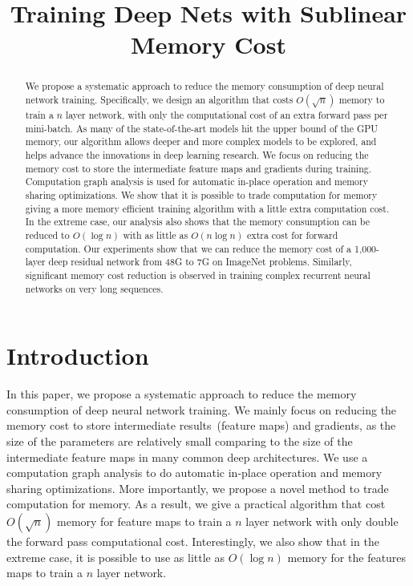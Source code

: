 \title{Training Deep Nets with Sublinear Memory Cost}

\begin{abstract}
We propose a systematic approach to reduce the memory consumption of deep neural network training. Specifically, we design an algorithm that costs $O(\sqrt{n})$ memory to train a $n$ layer network, with only the computational cost of an extra forward pass per mini-batch. As many of the state-of-the-art models hit the upper bound of the GPU memory, our algorithm allows deeper and more complex models to be explored, and helps advance the innovations in deep learning research. We focus on reducing the memory cost to store the intermediate feature maps and gradients during training. Computation graph analysis is used for automatic in-place operation and memory sharing optimizations. We show that it is possible to trade computation for memory giving a more memory efficient training algorithm with a little extra computation cost. In the extreme case, our analysis also shows that the memory consumption can be reduced to $O(\log
n)$ with as little as $O(n \log n)$ extra cost for forward computation. Our experiments show that we can reduce the memory cost of a 1,000-layer deep residual network from 48G to 7G on ImageNet problems. Similarly, significant memory cost reduction is observed in training complex recurrent neural networks on very long sequences.
\end{abstract}

\section{Introduction}

In this paper, we propose a systematic approach to reduce the memory consumption of deep neural network training. We mainly focus on reducing the memory cost to store intermediate results~(feature maps) and gradients, as the size of the parameters are relatively small comparing to the size of the intermediate feature maps in many common deep architectures. We use a computation graph analysis to do automatic in-place operation and memory sharing optimizations. More importantly, we propose a novel method to trade computation for memory. As a result, we give a practical algorithm that cost $O(\sqrt{n})$ memory for feature maps to train a $n$ layer network with only double the forward pass computational cost. Interestingly, we also show that in the extreme case, it is possible to use as little as $O(\log n)$ memory for the features maps to train a $n$ layer network.

